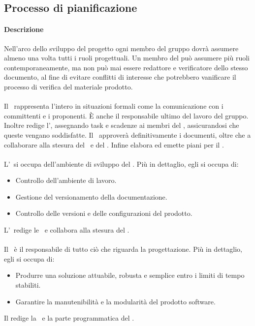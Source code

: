 \subsection{Processo di pianificazione}
\paragraph{Descrizione}
Nell'arco dello sviluppo del progetto ogni membro del gruppo dovrà assumere almeno una volta tutti i ruoli progettuali.
Un membro del  può assumere più ruoli contemporaneamente, ma non può mai essere redattore e verificatore dello stesso documento, al fine di evitare conflitti di interesse che potrebbero vanificare il processo di verifica del materiale prodotto.

\paragraph{\Pm}
Il \Pm\ rappresenta l'intero  in situazioni formali come la comunicazione con i committenti e i proponenti. È anche il responsabile ultimo del lavoro del gruppo. Inoltre redige l', assegnando task e scadenze ai membri del , assicurandosi che queste vengano soddisfatte. 
Il \Pm\ approverà definitivamente i documenti, oltre che a collaborare alla stesura del \PdP\  e del \PdQ.
Infine elabora ed emette piani per il .

\paragraph{\Am}
L'\Am\ si occupa dell'ambiente di sviluppo del . Più in dettaglio, egli si occupa di:
\begin{itemize}
  \item Controllo dell'ambiente di lavoro.
  \item Gestione del versionamento della documentazione.
  \item Controllo delle versioni e delle configurazioni del prodotto.
\end{itemize}
L'\Am\ redige le \NdP\ e collabora alla stesura del
\PdP.

\paragraph{\Prog} 
Il \Prog\ è il responsabile di tutto ciò che riguarda la progettazione.
Più in dettaglio, egli si occupa di:
\begin{itemize}
  \item Produrre una soluzione attuabile, robusta e semplice entro i limiti di
  tempo stabiliti.
  \item Garantire la manutenibilità e la modularità del prodotto software.
\end{itemize}
Il \Prog redige la \DDP\ e la parte programmatica del \PdQ.

